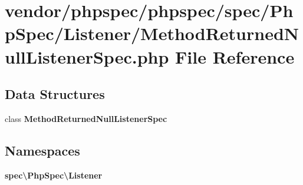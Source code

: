 \section{vendor/phpspec/phpspec/spec/\+Php\+Spec/\+Listener/\+Method\+Returned\+Null\+Listener\+Spec.php File Reference}
\label{_method_returned_null_listener_spec_8php}
\subsection*{Data Structures}
\begin{DoxyCompactItemize}
\item 
class {\bf Method\+Returned\+Null\+Listener\+Spec}
\end{DoxyCompactItemize}
\subsection*{Namespaces}
\begin{DoxyCompactItemize}
\item 
 {\bf spec\textbackslash{}\+Php\+Spec\textbackslash{}\+Listener}
\end{DoxyCompactItemize}
